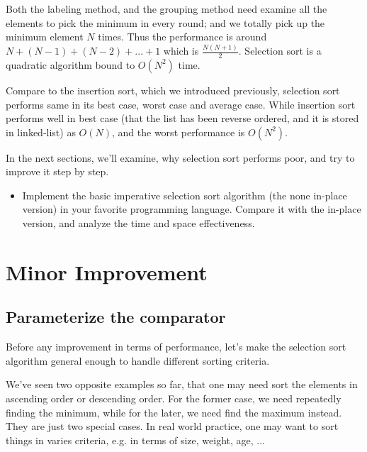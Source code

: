 \documentclass{article}
\begin{document}
Both the labeling method, and the grouping method need examine all the elements to
pick the minimum in every round; and we totally pick up the minimum element $N$ times.
Thus the performance is around $N + (N-1) + (N-2) + ... + 1$ which is $\frac{N(N+1)}{2}$.
Selection sort is a quadratic algorithm bound to $O(N^2)$ time.

Compare to the insertion sort, which we introduced previously, selection sort
performs same in its best case, worst case and average case. While insertion
sort performs well in best case (that the list has been reverse ordered, and it is stored
in linked-list) as $O(N)$, and the worst performance is $O(N^2)$.

In the next sections, we'll examine, why selection sort performs poor, and try
to improve it step by step.

\begin{Exercise}

\begin{itemize}
\item Implement the basic imperative selection sort algorithm (the none in-place version)
in your favorite programming language. Compare it with the in-place version, and analyze
the time and space effectiveness.
\end{itemize}

\end{Exercise}


\section{Minor Improvement}

\subsection{Parameterize the comparator}
Before any improvement in terms of performance, let's make the selection sort
algorithm general enough to handle different sorting criteria.

We've seen two opposite examples so far, that one may need sort the elements
in ascending order or descending order. For the former case, we need
repeatedly finding the minimum, while for the later, we need find the maximum
instead. They are just two special cases. In real world practice, one
may want to sort things in varies criteria, e.g. in terms of size, weight,
age, ...
\end{document}
